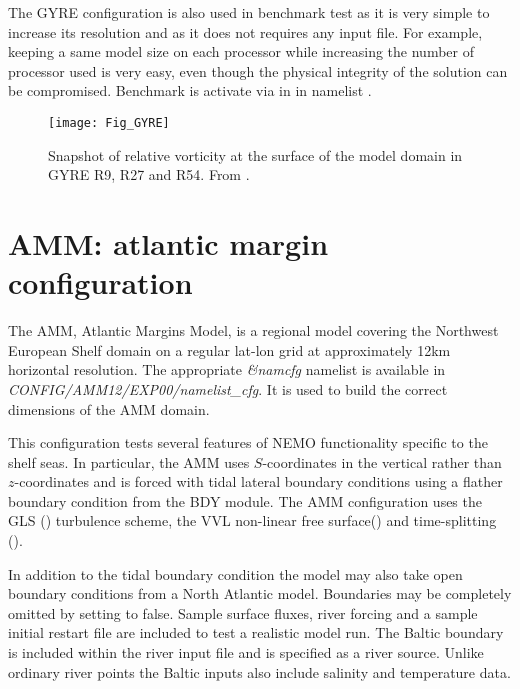 \documentclass[../tex_main/NEMO_manual]{subfiles}
\begin{document}
The GYRE configuration is also used in benchmark test as it is very simple to increase its resolution and
as it does not requires any input file.
For example, keeping a same model size on each processor while increasing the number of processor used is very easy,
even though the physical integrity of the solution can be compromised.
Benchmark is activate via  in  in
namelist .

\begin{figure}[!t]
  \begin{center}
    \texttt{[image: Fig\_GYRE]}
    \caption{  \protect\label{fig:GYRE}
      Snapshot of relative vorticity at the surface of the model domain in GYRE R9, R27 and R54.
      From \citet{Levy_al_OM10}.}
  \end{center}
\end{figure}

\section{AMM: atlantic margin configuration}
\label{sec:MISC_config_AMM}

The AMM, Atlantic Margins Model, is a regional model covering the Northwest European Shelf domain on
a regular lat-lon grid at approximately 12km horizontal resolution.
The appropriate \textit{\&namcfg} namelist  is available in \textit{CONFIG/AMM12/EXP00/namelist\_cfg}.
It is used to build the correct dimensions of the AMM domain.

This configuration tests several features of NEMO functionality specific to the shelf seas.
In particular, the AMM uses $S$-coordinates in the vertical rather than $z$-coordinates and
is forced with tidal lateral boundary conditions using a flather boundary condition from the BDY module.
The AMM configuration uses the GLS () turbulence scheme,
the VVL non-linear free surface() and time-splitting ().

In addition to the tidal boundary condition the model may also take open boundary conditions from
a North Atlantic model.
Boundaries may be completely omitted by setting  to false.
Sample surface fluxes, river forcing and a sample initial restart file are included to test a realistic model run.
The Baltic boundary is included within the river input file and is specified as a river source.
Unlike ordinary river points the Baltic inputs also include salinity and temperature data.
\end{document}
